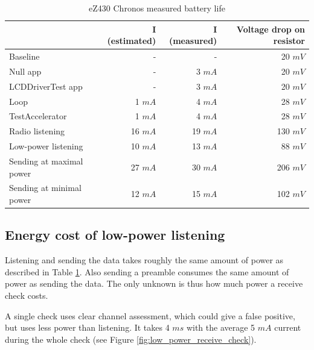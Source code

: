\begin{table}[h]
  \centering
    \begin{tabular}{|l|r|r|r|}
        \hline
              & \textbf{I (estimated)} & \textbf{I (measured)}          & \textbf{Voltage drop on resistor}  \\ \hline
Baseline & - & - & 20 $ mV $ \\ \hline
Null app    & - & 3 $ mA $          & 20 $ mV $  \\ \hline
LCDDriverTest app    & - & 3 $ mA $ & 20 $ mV $  \\ \hline
Loop    & 1 $ mA $ & 4 $ mA $          & 28 $ mV $  \\ \hline
TestAccelerator     & 1 $ mA $ & 4 $ mA $          & 28 $ mV $  \\ \hline
Radio listening     & 16 $ mA $ & 19 $ mA $   & 130 $ mV $  \\ \hline
Low-power listening     & 10 $ mA $ & 13 $ mA $              & 88 $ mV $  \\ \hline
Sending at maximal power     & 27 $ mA $ & 30 $ mA $              & 206 $ mV $  \\ \hline
Sending at minimal power      & 12 $ mA $ & 15 $ mA $            & 102 $ mV $  \\ \hline

    \end{tabular}
  \caption{eZ430 Chronos measured battery life}
  \label{tab:power-usage}
\end{table}

\subsection{Energy cost of low-power listening}

Listening and sending the data takes roughly the same amount of power as described in Table \ref{tab:power-usage}.
Also sending a preamble consumes the same amount of power as sending the data.
The only unknown is thus how much power a receive check costs.

A single check uses clear channel assessment, which could give a false positive, but uses less power than listening.
It takes 4 $ ms $ with the average 5 $ mA $ current during the whole check (see Figure \ref{fig:low_power_receive_check}).

